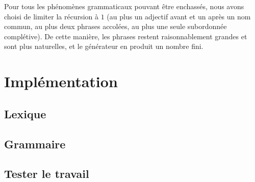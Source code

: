 \documentclass[a4paper,10pt]{article}
\begin{document}
Pour tous les phénomènes grammaticaux pouvant être enchassés, nous avons choisi de limiter la récursion à $1$ (au plus un adjectif avant et un après un nom commun, au plus deux phrases accolées, au plus une seule subordonnée complétive). De cette manière, les phrases restent raisonnablement grandes et sont plus naturelles, et le générateur en produit un nombre fini.

\section{Implémentation}
\subsection{Lexique}

\subsection{Grammaire}

\subsection{Tester le travail}
\end{document}
